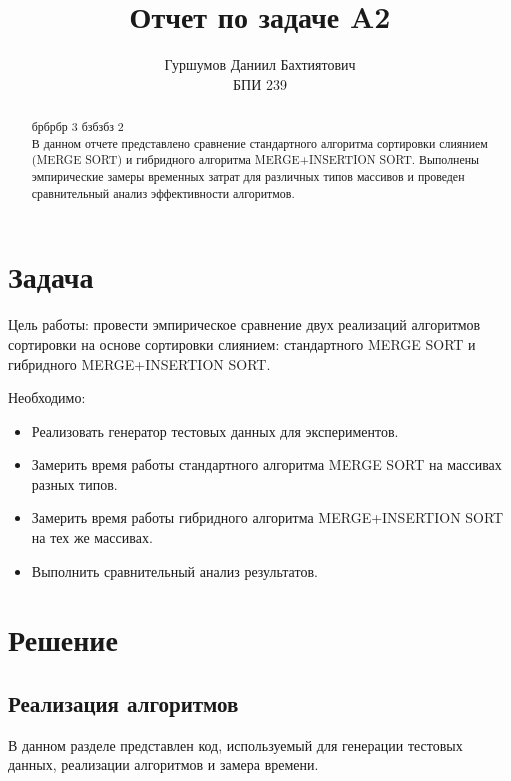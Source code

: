 \documentclass{article}
\title{Отчет по задаче A2}
\author{Гуршумов Даниил Бахтиятович \\ БПИ 239}
\date{}
\begin{document}
\maketitle

\begin{abstract}
брбрбр 3 бзбзбз 2
\\В данном отчете представлено сравнение стандартного алгоритма сортировки слиянием (MERGE SORT) и гибридного алгоритма MERGE+INSERTION SORT. Выполнены эмпирические замеры временных затрат для различных типов массивов и проведен сравнительный анализ эффективности алгоритмов.
\end{abstract}

\section{Задача}
Цель работы: провести эмпирическое сравнение двух реализаций алгоритмов сортировки на основе сортировки слиянием: стандартного MERGE SORT и гибридного MERGE+INSERTION SORT. 

Необходимо:
\begin{itemize}
    \item Реализовать генератор тестовых данных для экспериментов.
    \item Замерить время работы стандартного алгоритма MERGE SORT на массивах разных типов.
    \item Замерить время работы гибридного алгоритма MERGE+INSERTION SORT на тех же массивах.
    \item Выполнить сравнительный анализ результатов.
\end{itemize}

\section{Решение}

\subsection{Реализация алгоритмов}
В данном разделе представлен код, используемый для генерации тестовых данных, реализации алгоритмов и замера времени.
\end{document}
